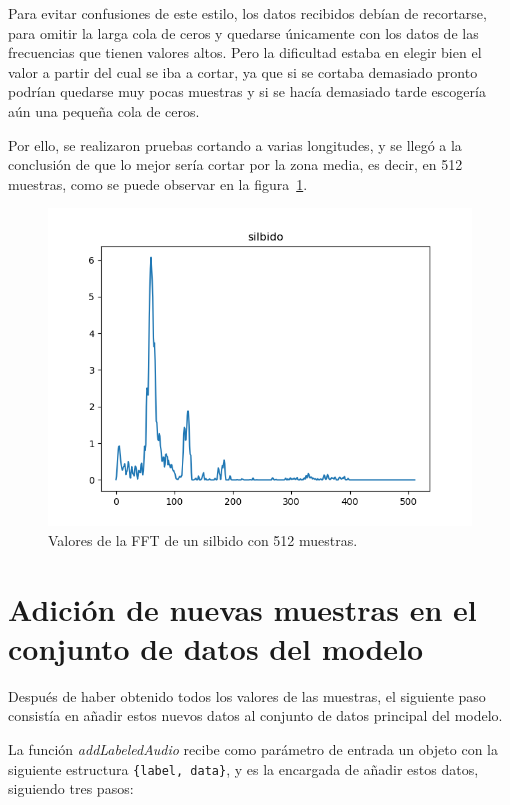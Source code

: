 \documentclass[a4paper, 12pt]{book}
\begin{document}
Para evitar confusiones de este estilo, los datos recibidos debían de recortarse, para omitir la larga cola de ceros y quedarse únicamente con los datos de las frecuencias que tienen valores altos. Pero la dificultad estaba en elegir bien el valor a partir del cual se iba a cortar, ya que si se cortaba demasiado pronto podrían quedarse muy pocas muestras y si se hacía demasiado tarde escogería aún una pequeña cola de ceros.

Por ello, se realizaron pruebas cortando a varias longitudes, y se llegó a la conclusión de que lo mejor sería cortar por la zona media, es decir, en 512 muestras, como se puede observar en la figura~\ref{fig:silbido512}.

\begin{figure}
	\centering
	\includegraphics[width=12cm, keepaspectratio]{img/silbido512.png}
	\caption{Valores de la FFT de un silbido con 512 muestras.}\label{fig:silbido512}
\end{figure}

\section{Adición de nuevas muestras en el conjunto de datos del modelo}
\label{sec:adicion-datos}

Después de haber obtenido todos los valores de las muestras, el siguiente paso consistía en añadir estos nuevos datos al conjunto de datos principal del modelo.

La función \textit{addLabeledAudio} recibe como parámetro de entrada un objeto con la siguiente estructura \texttt{\{label, data\}}, y es la encargada de añadir estos datos, siguiendo tres pasos:
\end{document}

